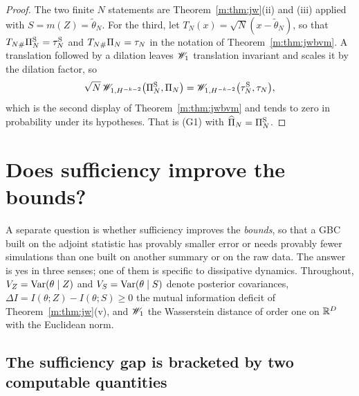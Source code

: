 \begin{proof}
The two finite $N$ statements are Theorem~\ref{m:thm:jw}(ii) and (iii) applied with $S=m(Z)=\tilde\theta_N$. For the third, let $T_N(x)=\sqrt N(x-\tilde\theta_N)$, so that $T_{N\#}\Pi^{\rm S}_N=\tau^{\rm S}_N$ and $T_{N\#}\Pi_N=\tau_N$ in the notation of Theorem~\ref{m:thm:jwbvm}. A translation followed by a dilation leaves $\mathscr{W}_1$ translation invariant and scales it by the dilation factor, so
\[
\sqrt N\,\mathscr{W}_{1,H^{-k-2}}\big(\Pi^{\rm S}_N,\Pi_N\big)=\mathscr{W}_{1,H^{-k-2}}\big(\tau^{\rm S}_N,\tau_N\big),
\]
which is the second display of Theorem~\ref{m:thm:jwbvm} and tends to zero in probability under its hypotheses. That is (G1) with $\widehat\Pi_N=\Pi^{\rm S}_N$.
\end{proof}

\section{Does sufficiency improve the bounds?}\label{m:sec:suffbounds}

A separate question is whether sufficiency improves the \emph{bounds}, so that a GBC built on the adjoint statistic has provably smaller error or needs provably fewer simulations than one built on another summary or on the raw data. The answer is yes in three senses; one of them is specific to dissipative dynamics. Throughout, $V_Z=\mathrm{Var}(\theta\mid Z)$ and $V_S=\mathrm{Var}(\theta\mid S)$ denote posterior covariances, $\Delta I=I(\theta;Z)-I(\theta;S)\ge0$ the mutual information deficit of Theorem~\ref{m:thm:jw}(v), and $\mathscr{W}_1$ the Wasserstein distance of order one on $\mathbb{R}^D$ with the Euclidean norm.

\subsection{The sufficiency gap is bracketed by two computable quantities}

